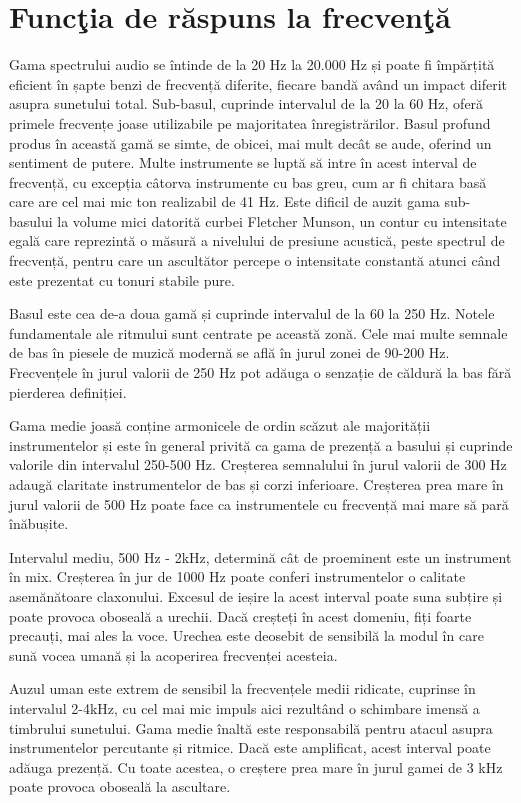 	\section{Func\c{t}ia de r\u{a}spuns la frecven\c{t}\u{a}}
	
	Gama spectrului audio se întinde de la 20 Hz la 20.000 Hz și poate fi împărțită eficient în șapte benzi de frecvență diferite, fiecare bandă având un impact diferit asupra sunetului total. Sub-basul, cuprinde intervalul de la 20 la 60 Hz, oferă primele frecvențe joase utilizabile pe majoritatea înregistrărilor. Basul profund produs în această gamă se simte, de obicei, mai mult decât se aude, oferind un sentiment de putere. Multe instrumente se luptă să intre în acest interval de frecvență, cu excepția câtorva instrumente cu bas greu, cum ar fi chitara basă care are cel mai mic ton realizabil de 41 Hz. Este dificil de auzit gama sub-basului la volume mici datorită curbei Fletcher Munson, un contur cu intensitate egală care reprezintă o măsură a nivelului de presiune acustică, peste spectrul de frecvență, pentru care un ascultător percepe o intensitate constantă atunci când este prezentat cu tonuri stabile pure.
	
	Basul este cea de-a doua gamă și cuprinde intervalul de la 60 la 250 Hz. Notele fundamentale ale ritmului sunt centrate pe această zonă. Cele mai multe semnale de bas în piesele de muzică modernă se află în jurul zonei de 90-200 Hz. Frecvențele în jurul valorii de 250 Hz pot adăuga o senzație de căldură la bas fără pierderea definiției.
	
	Gama medie joasă conține armonicele de ordin scăzut ale majorității instrumentelor și este în general privită ca gama de prezență a basului și cuprinde valorile din intervalul 250-500 Hz. Creșterea semnalului în jurul valorii de 300 Hz adaugă claritate instrumentelor de bas și corzi inferioare. Creșterea prea mare în jurul valorii de 500 Hz poate face ca instrumentele cu frecvență mai mare să pară înăbușite.
	
	Intervalul mediu, 500 Hz - 2kHz, determină cât de proeminent este un instrument în mix. Creșterea în jur de 1000 Hz poate conferi instrumentelor o calitate asemănătoare claxonului. Excesul de ieșire la acest interval poate suna subțire și poate provoca oboseală a urechii. Dacă creșteți în acest domeniu, fiți foarte precauți, mai ales la voce. Urechea este deosebit de sensibilă la modul în care sună vocea umană și la acoperirea frecvenței acesteia.
	
	Auzul uman este extrem de sensibil la frecvențele medii ridicate, cuprinse  în intervalul 2-4kHz, cu cel mai mic impuls aici rezultând o schimbare imensă a timbrului sunetului. Gama medie înaltă este responsabilă pentru atacul asupra instrumentelor percutante și ritmice. Dacă este amplificat, acest interval poate adăuga prezență. Cu toate acestea, o creștere prea mare în jurul gamei de 3 kHz poate provoca oboseală la ascultare.
	
